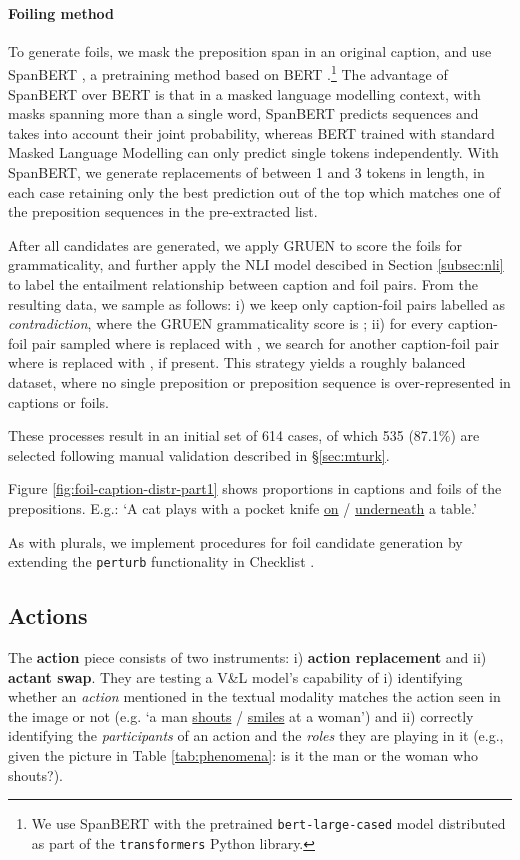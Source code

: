 \documentclass[11pt]{article}
\newcommand{\gr}[1]{\textcolor{niceblue}{#1}}
\newcommand\red[1]{\textcolor{niceorange}{#1}}
\begin{document}
\paragraph{Foiling method} To generate foils, we mask the preposition span in an original caption, and use SpanBERT \cite{joshi-etal-2020-spanbert}, a pretraining method based on BERT \cite{devlin2019bert}.\footnote{We use SpanBERT with the pretrained {\tt bert-large-cased} model distributed as part of the {\tt transformers} Python library. } The advantage of SpanBERT over BERT is that in a masked language modelling context, with masks spanning more than a single word, SpanBERT predicts sequences and takes into account their joint probability, whereas BERT trained with standard Masked Language Modelling can only predict single tokens independently. With SpanBERT, we generate replacements of between 1 and 3 tokens in length, in each case retaining only the best prediction out of the top  which matches one of the preposition sequences in the pre-extracted list. 




After all candidates are generated, we apply GRUEN \cite{zhu-bhat-2020-gruen} to score the foils for grammaticality, and further apply the NLI model descibed in Section \ref{subsec:nli} to label the entailment relationship between caption and foil pairs. From the resulting data, we sample as follows: i) we keep only caption-foil pairs labelled as {\em contradiction}, where the GRUEN grammaticality score is ; ii) for every caption-foil pair sampled where  is replaced with , we search for another caption-foil pair where  is replaced with , if present. This strategy yields a roughly balanced dataset, where no single preposition or preposition sequence is over-represented in captions or foils. 


These processes result in an initial set of 614 cases, of which 535 (87.1\%) are selected following manual validation described in \S \ref{sec:mturk}. 

Figure \ref{fig:foil-caption-distr-part1} shows proportions in captions and foils of the prepositions. E.g.: `A cat plays with a pocket knife \gr{\underline{on}} / \red{\underline{underneath}} a table.'

As with plurals, we implement procedures for foil candidate generation by extending the \texttt{perturb} functionality in Checklist \cite{ribeiro-etal-2020-beyond}.

\subsection{Actions}\label{app:actions}
The \textbf{action} piece consists of two instruments: i) \textbf{action replacement} and ii) \textbf{actant swap}.
They are testing a V\&L model's capability of i) identifying whether an \textit{action} mentioned in the textual modality matches the action seen in the image or not (e.g. `a man \gr{\underline{shouts}} / \red{\underline{smiles}} at a woman') 
and ii) correctly identifying the \textit{participants} of an action and the \textit{roles} they are playing in it (e.g., given the picture in Table \ref{tab:phenomena}: is it the man or the woman who shouts?).
\end{document}
